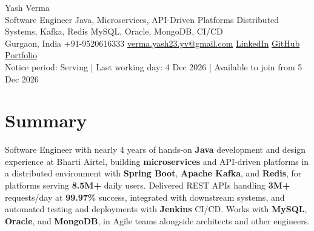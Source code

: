 \documentclass[letterpaper,10pt]{article}
\begin{document}
\begin{center}
  {\Huge Yash Verma} \\
  \small Software Engineer \textbar{} Java, Microservices, API-Driven Platforms \textbar{} Distributed Systems, Kafka, Redis \textbar{} MySQL, Oracle, MongoDB, CI/CD \\
  \small Gurgaon, India \textbar{} +91-9520616333 \textbar{} \href{mailto:verma.yash23.yv@gmail.com}{verma.yash23.yv@gmail.com} \textbar{}
  \href{https://www.linkedin.com/in/yash-verma-9243a7193/}{LinkedIn} \textbar{}
  \href{https://github.com/yashverma230600}{GitHub} \textbar{}
  \href{https://yashverma230600.github.io/yash-portfolio/}{Portfolio} \\
  Notice period: Serving | Last working day: 4 Dec 2026 | Available to join from 5 Dec 2026
  \vspace{-8pt}
\end{center}

\section{Summary}
\begin{itemize}[leftmargin=0.15in, label={}]
  \small{\item{
    Software Engineer with nearly 4 years of hands-on \textbf{Java} development and design experience at Bharti Airtel, building \textbf{microservices} and API-driven platforms in a distributed environment with \textbf{Spring Boot}, \textbf{Apache Kafka}, and \textbf{Redis}, for platforms serving \textbf{8.5M+} daily users. Delivered REST APIs handling \textbf{3M+} requests/day at \textbf{99.97\%} success, integrated with downstream systems, and automated testing and deployments with \textbf{Jenkins} CI/CD. Works with \textbf{MySQL}, \textbf{Oracle}, and \textbf{MongoDB}, in Agile teams alongside architects and other engineers.
  }}
\end{itemize}
\vspace{-8pt}

\end{document}
